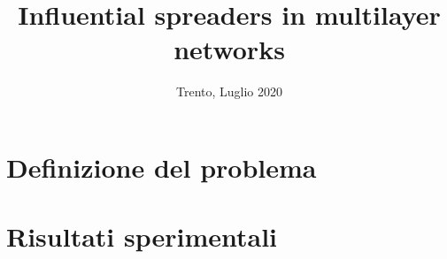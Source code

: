 \documentclass[xcolor={dvipsnames, table}]{beamer}
\title{Influential spreaders in multilayer networks}
\author[Gabriele Masina]{%
    \texorpdfstring{%
        \begin{columns}
            \column{.5\linewidth}
            \centering
            {\scriptsize Supervisore} \\ Alberto Montresor
            \column{.5\linewidth}
            \centering
            {\scriptsize Laureando} \\ Gabriele Masina
        \end{columns}
    }{Gabriele Masina}
}
\institute[UniTN]{
    \texorpdfstring{%
        \texttt{[image: img/marchio\_unitrento\_colore\_it\_v2.eps]}
    }{Università di Trento}\\[1em]
    Dipartimento di Ingegneria e Scienza dell’Informazione \\[1em] 
    Corso di Laurea in Informatica
}
\date[A.A 2019/2020]{Trento, Luglio 2020}
\theoremstyle{definition}
\begin{document}
\begin{frame}
    \maketitle
\end{frame}
\section{Definizione del problema}




\section{Risultati sperimentali}











\end{document}
